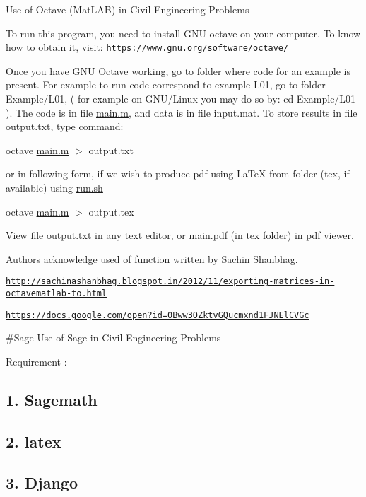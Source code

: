 Use of Octave (Mat\+L\+A\+B) in Civil Engineering Problems

To run this program, you need to install {\ttfamily G\+N\+U octave} on your computer. To know how to obtain it, visit\+: \href{https://www.gnu.org/software/octave/}{\tt https\+://www.\+gnu.\+org/software/octave/}

Once you have G\+N\+U Octave working, go to folder where code for an example is present. For example to run code correspond to example L01, go to folder Example/\+L01, ( for example on G\+N\+U/\+Linux you may do so by\+: {\ttfamily cd Example/\+L01} ). The code is in file {\ttfamily \hyperlink{namespacemain_af6e3698b7f50fc004eb759d7c447fdb3}{main.\+m}}, and data is in file {\ttfamily input.\+mat}. To store results in file {\ttfamily output.\+txt}, type command\+:

{\ttfamily octave \hyperlink{namespacemain_af6e3698b7f50fc004eb759d7c447fdb3}{main.\+m} $>$ output.\+txt}

or in following form, if we wish to produce pdf using La\+Te\+X from folder (tex, if available) using \hyperlink{run_8sh}{run.\+sh}

{\ttfamily octave \hyperlink{namespacemain_af6e3698b7f50fc004eb759d7c447fdb3}{main.\+m} $>$ output.\+tex}

View file output.\+txt in any text editor, or main.\+pdf (in tex folder) in pdf viewer.

Authors acknowledge used of function written by Sachin Shanbhag.

\href{http://sachinashanbhag.blogspot.in/2012/11/exporting-matrices-in-octavematlab-to.html}{\tt http\+://sachinashanbhag.\+blogspot.\+in/2012/11/exporting-\/matrices-\/in-\/octavematlab-\/to.\+html}

\href{https://docs.google.com/open?id=0Bww3OZktvGQucmxnd1FJNElCVGc}{\tt https\+://docs.\+google.\+com/open?id=0\+Bww3\+O\+Zktv\+G\+Qucmxnd1\+F\+J\+N\+El\+C\+V\+Gc}

\#\+Sage Use of Sage in Civil Engineering Problems

Requirement-\/\+:

\subsection*{1. Sagemath}

\subsection*{2. latex}

\subsection*{3. Django}